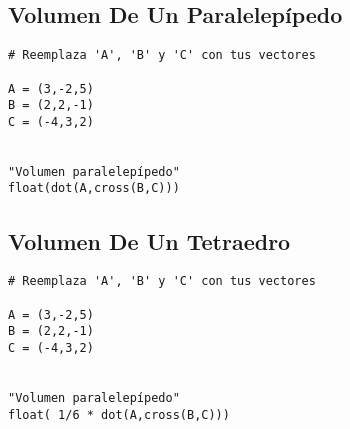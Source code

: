 \documentclass{article}
\begin{document}
\subsection{Volumen De Un Paralelepípedo}
\label{sec:org49eec07}
\begin{verbatim}
# Reemplaza 'A', 'B' y 'C' con tus vectores

A = (3,-2,5)
B = (2,2,-1)
C = (-4,3,2)


"Volumen paralelepípedo"
float(dot(A,cross(B,C)))
\end{verbatim}

\subsection{Volumen De Un Tetraedro}
\label{sec:org53a3fa1}
\begin{verbatim}
# Reemplaza 'A', 'B' y 'C' con tus vectores

A = (3,-2,5)
B = (2,2,-1)
C = (-4,3,2)


"Volumen paralelepípedo"
float( 1/6 * dot(A,cross(B,C)))
\end{verbatim}
\end{document}
